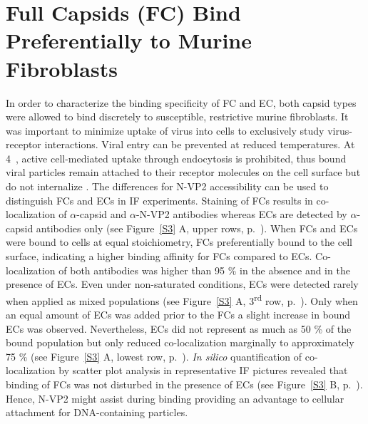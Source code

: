 \section{Full Capsids (FC) Bind Preferentially to Murine Fibroblasts}

In order to characterize the binding specificity of FC and EC, both capsid types were allowed to bind discretely to susceptible, restrictive murine fibroblasts. It was important to minimize uptake of virus into cells to exclusively study virus-receptor interactions. Viral entry can be prevented at reduced temperatures. At 4~\textcelsius, active cell-mediated uptake through endocytosis is prohibited, thus bound viral particles remain attached to their receptor molecules on the cell surface but do not internalize \cite{pmid20517}. The differences for N-VP2 accessibility can be used to distinguish FCs and ECs in IF experiments. Staining of FCs results in co-localization of $\alpha$-capsid and $\alpha$-N-VP2 antibodies whereas ECs are detected by $\alpha$-capsid antibodies only (see Figure~\ref{S3} A, upper rows, p.~\pageref{S3}). When FCs and ECs were bound to cells at equal stoichiometry, FCs preferentially bound to the cell surface, indicating a higher binding affinity for FCs compared to ECs. Co-localization of both antibodies was higher than 95 \% in the absence and in the presence of ECs. Even under non-saturated conditions, ECs were detected rarely when applied as mixed populations (see Figure~\ref{S3} A, 3\textsuperscript{rd} row, p.~\pageref{S3}). Only when an equal amount of ECs was added prior to the FCs a slight increase in bound ECs was observed. Nevertheless, ECs did not represent as much as 50 \% of the bound population but only reduced co-localization marginally to approximately 75 \% (see Figure~\ref{S3} A, lowest row, p.~\pageref{S3}). \textit{In silico} quantification of co-localization by scatter plot analysis in representative IF pictures revealed that binding of FCs was not disturbed in the presence of ECs (see Figure~\ref{S3} B, p.~\pageref{S3}). Hence, N-VP2 might assist during binding providing an advantage to cellular attachment for DNA-containing particles.            


